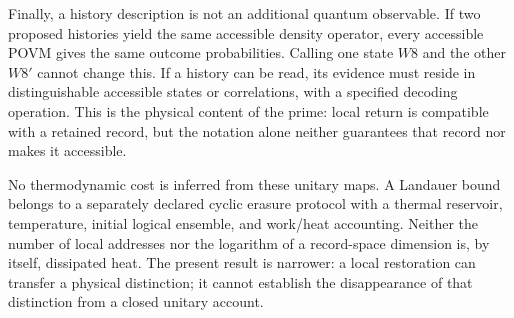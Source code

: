 Finally, a history description is not an additional quantum observable.
If two proposed histories yield the same accessible density operator,
every accessible POVM gives the same outcome probabilities. Calling one
state $W8$ and the other $W8'$ cannot change this. If a history can be
read, its evidence must reside in distinguishable accessible states or
correlations, with a specified decoding operation. This is the physical
content of the prime: local return is compatible with a retained record,
but the notation alone neither guarantees that record nor makes it
accessible.

No thermodynamic cost is inferred from these unitary maps. A Landauer
bound belongs to a separately declared cyclic erasure protocol with a
thermal reservoir, temperature, initial logical ensemble, and work/heat
accounting. Neither the number of local addresses nor the logarithm of a
record-space dimension is, by itself, dissipated heat. The present result
is narrower: a local restoration can transfer a physical distinction;
it cannot establish the disappearance of that distinction from a closed
unitary account.

